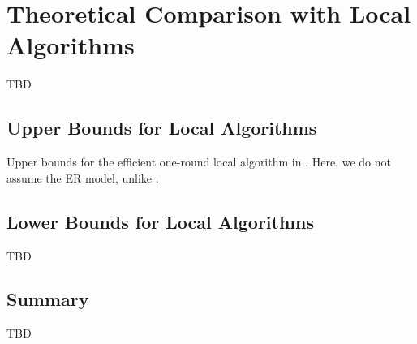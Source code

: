 \section{Theoretical Comparison with Local Algorithms}
\label{chap3-sec:comp}
TBD

\subsection{Upper Bounds for Local Algorithms}
\label{chap3-sub:upper}
Upper bounds for the efficient one-round local algorithm in \cite{Imola_USENIX22}. Here, we do not assume the ER model, unlike \cite{Imola_USENIX21}. 

\subsection{Lower Bounds for Local Algorithms}
\label{chap3-sub:lower}
TBD

\subsection{Summary}
\label{chap3-sub:comp}
TBD
